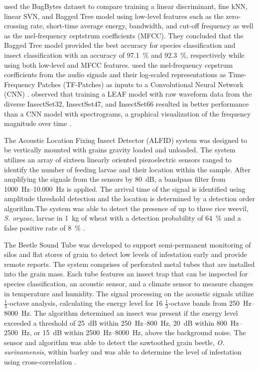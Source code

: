 \citeauthor{phungAutomatedInsectDetection2017} used the BugBytes dataset to compare training a linear discriminant, fine kNN, linear SVN, and Bagged Tree model using low-level features such as the zero-crossing rate, short-time average energy, bandwidth, and cut-off frequency as well as the mel-frequency ceptstrum coefficients (MFCC). They concluded that the Bagged Tree model provided the best accuracy for species classification and insect classification with an accuracy of \SI{97.1}{\percent} and \SI{92.3}{\percent}, respectively while using both low-level and MFCC features. \citeauthor{montemayorDetectingRiceWeevils2024} used the mel-frequency cepstrum coefficients from the audio signals and their log-scaled representations as Time-Frequency Patches (TF-Patches) as inputs to a Convolutional Neural Network (CNN) \cite{montemayorDetectingRiceWeevils2024}. \citeauthor{faissAdaptiveRepresentationsSound2023} observed that training a LEAF model with raw waveform data from the diverse InsectSet32, InsectSet47, and InsectSet66 resulted in better performance than a CNN model with spectrograms, a graphical visualization of the frequency magnitude over time \cite{faissAdaptiveRepresentationsSound2023}.

The Acoustic Location Fixing Insect Detector (ALFID) system was designed to be vertically mounted with grains gravity loaded and unloaded. The system utilizes an array of sixteen linearly oriented piezoelectric sensors ranged to identify the number of feeding larvae and their location within the sample. After amplifying the signals from the sensors by \SI{80}{\deci\bel}, a bandpass filter from \SIrange{1000}{10,000}{\hertz} is applied. The arrival time of the signal is identified using amplitude threshold detection and the location is determined by a detection order algorithm.The system was able to detect the presence of up to three rice weevil, \textit{S. oryzae}, larvae in \SI{1}{\kilo\gram} of wheat with a detection probability of \SI{64}{\percent} and a false positive rate of \SI{8}{\percent} \cite{shumanQuantitativeAcousticalDetection1993,vickAcousticLocationFixing1996}.

The Beetle Sound Tube was developed to support semi-permanent monitoring of silos and flat stores of grain to detect low levels of infestation early and provide remote reports. The system comprises of perforated metal tubes that are installed into the grain mass. Each tube features an insect trap that can be inspected for species classification, an acoustic sensor, and a climate sensor to measure changes in temperature and humidity. The signal processing on the acoustic signals utilize $\frac{1}{3}$-octave analysis, calculating the energy level for 16 $\frac{1}{3}$-octave bands from \SIrange{250}{8000}{\hertz}. The algorithm determined an insect was present if the energy level exceeded a threshold of \SI{25}{\deci\bel} within \SIrange{250}{800}{\hertz}, \SI{20}{\deci\bel} within \SIrange{800}{2500}{\hertz}, or \SI{15}{\deci\bel} within \SIrange{2500}{8000}{\hertz}, above the background noise. The sensor and algorithm was able to detect the sawtoothed grain beetle, \textit{O. surinamensis}, within barley and was able to determine the level of infestation using cross-correlation \cite{muller-blenkleMethodAcousticStorage2023}.

